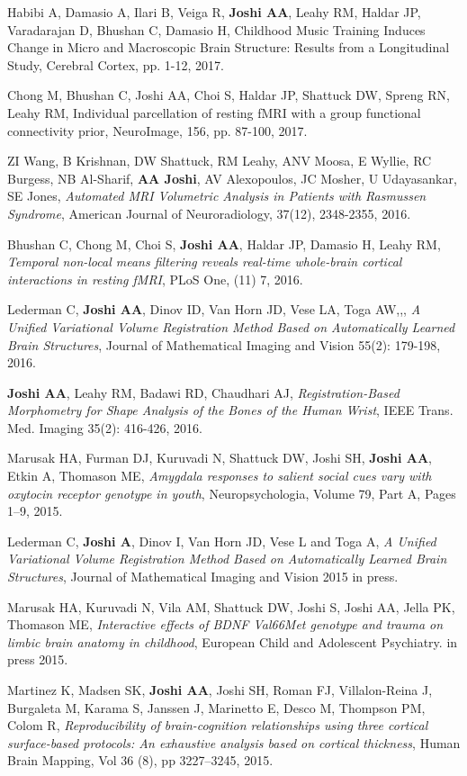 \documentclass[overlapped,line,letterpaper]{res}
\begin{document}
\begin{resume}
Habibi A, Damasio A, Ilari B, Veiga R, \textbf{Joshi AA}, Leahy RM, Haldar JP, Varadarajan D, Bhushan C, Damasio H, Childhood Music Training Induces Change in Micro and Macroscopic Brain Structure: Results from a Longitudinal Study, Cerebral Cortex, pp. 1-12, 2017.

Chong M, Bhushan C, Joshi AA, Choi S, Haldar JP, Shattuck DW, Spreng RN, Leahy RM, Individual parcellation of resting fMRI with a group functional connectivity prior, NeuroImage, 156, pp. 87-100, 2017. 

ZI Wang, B Krishnan, DW Shattuck, RM Leahy, ANV Moosa, E Wyllie, RC Burgess, NB Al-Sharif, \textbf{AA Joshi}, AV Alexopoulos, JC Mosher, U Udayasankar, SE Jones, \textit{Automated MRI Volumetric Analysis in Patients with Rasmussen Syndrome}, American Journal of Neuroradiology, 37(12), 2348-2355, 2016.

Bhushan C, Chong M, Choi S, \textbf{Joshi AA}, Haldar JP, Damasio H, Leahy RM, \textit{Temporal non-local means filtering reveals real-time whole-brain cortical interactions in resting fMRI}, PLoS One, (11) 7, 2016.

Lederman C, \textbf{Joshi AA}, Dinov ID, Van Horn JD, Vese LA, Toga AW,,, \textit{A Unified Variational Volume Registration Method Based on Automatically Learned Brain Structures}, Journal of Mathematical Imaging and Vision 55(2): 179-198, 2016.

\textbf{Joshi AA}, Leahy RM, Badawi RD, Chaudhari AJ, \textit{Registration-Based Morphometry for Shape Analysis of the Bones of the Human Wrist}, IEEE Trans. Med. Imaging 35(2): 416-426, 2016.

Marusak HA, Furman DJ, Kuruvadi N, Shattuck DW, Joshi SH, \textbf{Joshi AA}, Etkin A, Thomason ME, \textit{Amygdala responses to salient social cues vary with oxytocin receptor genotype in youth}, Neuropsychologia, Volume 79, Part A, Pages 1–9, 2015.

Lederman C, \textbf{Joshi A}, Dinov I, Van Horn JD, Vese L and Toga A, \textit{A Unified Variational Volume Registration Method Based on Automatically Learned Brain Structures}, Journal of Mathematical Imaging and Vision 2015 in press.

Marusak HA, Kuruvadi N, Vila AM, Shattuck DW, Joshi S, Joshi AA, Jella PK, Thomason ME, \textit{Interactive effects of BDNF Val66Met genotype and trauma on limbic brain anatomy in childhood}, European Child and Adolescent Psychiatry. in press 2015.

Martinez K, Madsen SK, \textbf{Joshi AA}, Joshi SH, Roman FJ, Villalon-Reina J, Burgaleta M, Karama S, Janssen J, Marinetto E, Desco M, Thompson PM, Colom R, \textit{Reproducibility of brain-cognition relationships using three cortical surface-based protocols: An exhaustive analysis based on cortical thickness}, Human Brain Mapping, Vol 36 (8), pp 3227–3245, 2015.


\end{resume}
\end{document}
